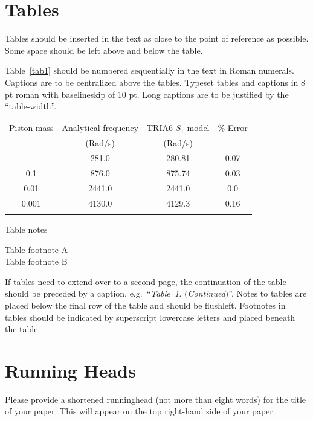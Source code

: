 \documentclass{ws-ijicc}
\begin{document}
\section{Tables}
Tables should be inserted in the text as close to the point of
reference as possible. Some space should be left above and below
the table.

Table~\ref{tab1} should be numbered sequentially in the text in
Roman numerals. Captions are to be centralized above the tables.
Typeset tables and captions in 8 pt roman with baselineskip of 10
pt. Long captions are to be justified by the ``table-width''.

\begin{table}[th]
{\begin{tabular}{@{}cccc@{}} \toprule
Piston mass & Analytical frequency & TRIA6-$S_1$ model &
\% Error \\
& (Rad/s) & (Rad/s) \\ \colrule
1.0\hphantom{00} & \hphantom{0}281.0 & \hphantom{0}280.81 & 0.07 \\
0.1\hphantom{00} & \hphantom{0}876.0 & \hphantom{0}875.74 & 0.03 \\
0.01\hphantom{0} & 2441.0 & 2441.0\hphantom{0} & 0.0\hphantom{0} \\
0.001 & 4130.0 & 4129.3\hphantom{0} & 0.16\\ \botrule
\end{tabular} }
\begin{tabnote}
Table notes
\end{tabnote}
\begin{tabfootnote}
 Table footnote A\\
 Table footnote B
\end{tabfootnote}
\end{table}

If tables need to extend over to a second page, the continuation of
the table should be preceded by a caption, e.g.~``{\it Table~1.}
$(${\it Continued}$)$''. Notes to tables are placed below the final
row of the table and should be flushleft.  Footnotes in tables
should be indicated by superscript lowercase letters and placed beneath
the table.

\section{Running Heads}
Please provide a shortened runninghead (not more than eight words) for
the title of your paper. This will appear on the top right-hand side
of your paper.
\end{document}
